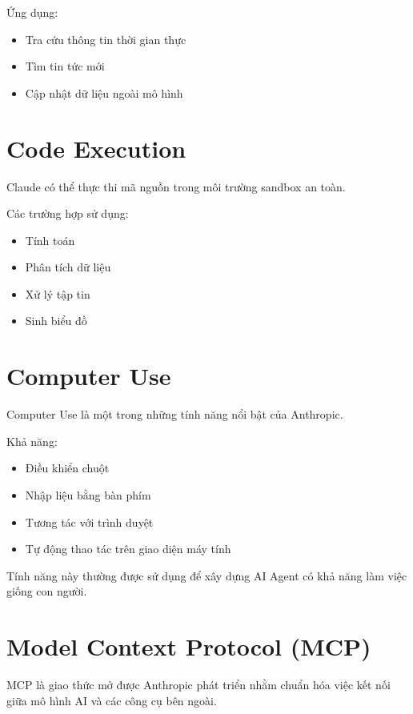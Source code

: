\documentclass[12pt]{article}
\begin{document}
Ứng dụng:

\begin{itemize}
    \item Tra cứu thông tin thời gian thực
    \item Tìm tin tức mới
    \item Cập nhật dữ liệu ngoài mô hình
\end{itemize}

\section{Code Execution}

Claude có thể thực thi mã nguồn trong môi trường sandbox an toàn.

Các trường hợp sử dụng:

\begin{itemize}
    \item Tính toán
    \item Phân tích dữ liệu
    \item Xử lý tập tin
    \item Sinh biểu đồ
\end{itemize}

\section{Computer Use}

Computer Use là một trong những tính năng nổi bật của Anthropic.

Khả năng:

\begin{itemize}
    \item Điều khiển chuột
    \item Nhập liệu bằng bàn phím
    \item Tương tác với trình duyệt
    \item Tự động thao tác trên giao diện máy tính
\end{itemize}

Tính năng này thường được sử dụng để xây dựng AI Agent có khả năng làm việc giống con người.

\section{Model Context Protocol (MCP)}

MCP là giao thức mở được Anthropic phát triển nhằm chuẩn hóa việc kết nối giữa mô hình AI và các công cụ bên ngoài.
\end{document}
